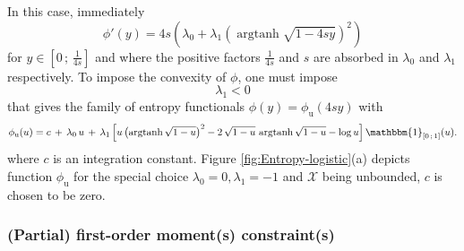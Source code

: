 \documentclass[english,sort&compress]{elsarticle}
\theoremstyle{definition}
\theoremstyle{plain}
\theoremstyle{plain}
\def\X{\mathcal{X}}
\def\un{\mathbbm{1}}
\def\argtanh{\operatorname{argtanh}}
\begin{document}
In this case, immediately 
%
\[
\phi'(y)  =  4  s  \left(  \lambda_0  +  \lambda_1  \left(  \argtanh\sqrt{1-4sy}
  \right)^2 \right)
\]
%
for $y \in \left[ 0 \, ; \, \frac{1}{4s} \right]$ and where the positive factors
$\frac{1}{4   s}$  and  $s$   are  absorbed   in  $\lambda_0$   and  $\lambda_1$
respectively.  To impose the convexity of $\phi$, one must impose
%
\[
\lambda_1 < 0
\]
%
that gives  the family of  entropy functionals $\phi(y) =  \phi_{\mathrm{u}}(4 s
y)$ with
%
\[
\phi_{\mathrm{u}}(u) = c \,  + \,  \lambda_0 \, u  \, +  \, \lambda_1  \left[ u
  \left( \argtanh\sqrt{1-u} \right)^2 -  2 \, \sqrt{1-u} \, \argtanh\sqrt{1-u} -
  \log u \right] \un_{\left[ 0 \, ; \, 1 \right]}(u).
\]
%
where  $c$  is an  integration  constant.  Figure  \ref{fig:Entropy-logistic}(a)
depicts  function $\phi_{\mathrm{u}}$  for the  special choice  $\lambda_0  = 0,
\lambda_1 = -1$ and $\X$ being unbounded, $c$ is chosen to be zero.



\subsubsection{(Partial) first-order moment(s) constraint(s)}
\end{document}
